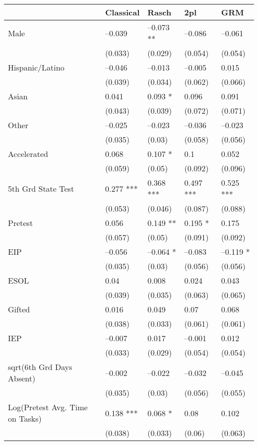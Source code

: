 \begin{tabular}{lllll}
  \hline
  & Classical & Rasch & 2pl & GRM \\ 
   \hline
Male & --0.039 & --0.073 ** & --0.086 & --0.061 \\ 
   & (0.033) & (0.029) & (0.054) & (0.054) \\ 
  Hispanic/Latino & --0.046 & --0.013 & --0.005 & 0.015 \\ 
   & (0.039) & (0.034) & (0.062) & (0.066) \\ 
  Asian & 0.041 & 0.093 * & 0.096 & 0.091 \\ 
   & (0.043) & (0.039) & (0.072) & (0.071) \\ 
  Other & --0.025 & --0.023 & --0.036 & --0.023 \\ 
   & (0.035) & (0.03) & (0.058) & (0.056) \\ 
  Accelerated & 0.068 & 0.107 * & 0.1 & 0.052 \\ 
   & (0.059) & (0.05) & (0.092) & (0.096) \\ 
  5th Grd State Test & 0.277 *** & 0.368 *** & 0.497 *** & 0.525 *** \\ 
   & (0.053) & (0.046) & (0.087) & (0.088) \\ 
  Pretest & 0.056 & 0.149 ** & 0.195 * & 0.175 \\ 
   & (0.057) & (0.05) & (0.091) & (0.092) \\ 
  EIP & --0.056 & --0.064 * & --0.083 & --0.119 * \\ 
   & (0.035) & (0.03) & (0.056) & (0.056) \\ 
  ESOL & 0.04 & 0.008 & 0.024 & 0.043 \\ 
   & (0.039) & (0.035) & (0.063) & (0.065) \\ 
  Gifted & 0.016 & 0.049 & 0.07 & 0.068 \\ 
   & (0.038) & (0.033) & (0.061) & (0.061) \\ 
  IEP & --0.007 & 0.017 & --0.001 & 0.012 \\ 
   & (0.033) & (0.029) & (0.054) & (0.054) \\ 
  sqrt(6th Grd Days Absent) & --0.002 & --0.022 & --0.032 & --0.045 \\ 
   & (0.035) & (0.03) & (0.056) & (0.055) \\ 
  Log(Pretest Avg. Time on Tasks) & 0.138 *** & 0.068 * & 0.08 & 0.102 \\ 
   & (0.038) & (0.033) & (0.06) & (0.063) \\ 

\end{tabular}
